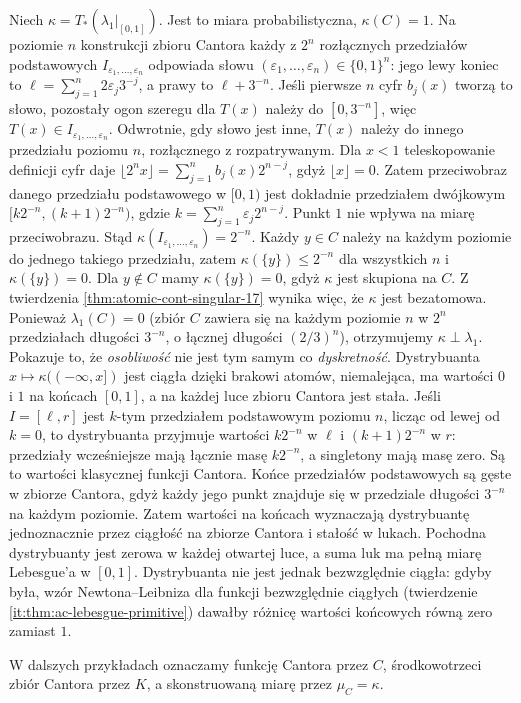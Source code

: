 \begin{przyklad}
Niech $\kappa=T_*(\lambda_1|_{[0,1]})$. Jest to miara
probabilistyczna, $\kappa(C)=1$. Na poziomie $n$ konstrukcji zbioru Cantora
każdy z $2^n$ rozłącznych przedziałów podstawowych
$I_{\varepsilon_1,\ldots,\varepsilon_n}$ odpowiada
słowu $(\varepsilon_1,\ldots,\varepsilon_n)\in\{0,1\}^n$:
jego lewy koniec to $\ell=\sum_{j=1}^n2\varepsilon_j3^{-j}$,
a prawy to $\ell+3^{-n}$. Jeśli pierwsze $n$ cyfr
$b_j(x)$ tworzą to słowo, pozostały ogon szeregu dla
$T(x)$ należy do $[0,3^{-n}]$, więc $T(x)\in
I_{\varepsilon_1,\ldots,\varepsilon_n}$. Odwrotnie,
gdy słowo jest inne, $T(x)$ należy do innego przedziału
poziomu $n$, rozłącznego z rozpatrywanym.
Dla $x<1$ teleskopowanie definicji cyfr daje
$\lfloor2^nx\rfloor=\sum_{j=1}^n b_j(x)2^{n-j}$,
gdyż $\lfloor x\rfloor=0$.
Zatem przeciwobraz danego przedziału podstawowego
w $[0,1)$ jest dokładnie przedziałem dwójkowym
$[k2^{-n},(k+1)2^{-n})$, gdzie
$k=\sum_{j=1}^n\varepsilon_j2^{n-j}$.
Punkt $1$ nie wpływa na miarę przeciwobrazu. Stąd
$\kappa(I_{\varepsilon_1,\ldots,\varepsilon_n})=2^{-n}$.
Każdy $y\in C$ należy na każdym poziomie do jednego
takiego przedziału, zatem
$\kappa(\{y\})\le2^{-n}$ dla wszystkich $n$ i
$\kappa(\{y\})=0$. Dla $y\notin C$ mamy
$\kappa(\{y\})=0$, gdyż $\kappa$ jest skupiona na $C$.
Z twierdzenia \ref{thm:atomic-cont-singular-17} wynika więc, że $\kappa$ jest bezatomowa. Ponieważ
$\lambda_1(C)=0$ (zbiór $C$ zawiera się na każdym poziomie $n$ w $2^n$ przedziałach długości $3^{-n}$, o łącznej długości $(2/3)^n$), otrzymujemy $\kappa\perp\lambda_1$.
Pokazuje to, że \emph{osobliwość} nie jest tym samym co
\emph{dyskretność}. Dystrybuanta $x\mapsto\kappa((-\infty,x])$ jest ciągła dzięki brakowi atomów, niemalejąca, ma wartości $0$ i $1$ na końcach $[0,1]$, a na każdej luce zbioru Cantora jest stała. Jeśli $I=[\ell,r]$ jest $k$-tym przedziałem
podstawowym poziomu $n$, licząc od lewej od $k=0$,
to dystrybuanta przyjmuje wartości $k2^{-n}$ w $\ell$
i $(k+1)2^{-n}$ w $r$: przedziały wcześniejsze mają
łącznie masę $k2^{-n}$, a singletony mają masę zero.
Są to wartości klasycznej funkcji Cantora. Końce
przedziałów podstawowych są gęste w zbiorze Cantora,
gdyż każdy jego punkt znajduje się w przedziale
długości $3^{-n}$ na każdym poziomie. Zatem wartości
na końcach wyznaczają dystrybuantę jednoznacznie
przez ciągłość na zbiorze Cantora i stałość w lukach.
Pochodna dystrybuanty jest zerowa w każdej otwartej
luce, a suma luk ma pełną miarę Lebesgue'a w $[0,1]$.
Dystrybuanta nie jest jednak bezwzględnie ciągła:
gdyby była, wzór Newtona--Leibniza dla funkcji
bezwzględnie ciągłych
(twierdzenie \ref{it:thm:ac-lebesgue-primitive})
dawałby różnicę wartości końcowych równą zero zamiast $1$.
\end{przyklad}
W dalszych przykładach oznaczamy funkcję Cantora przez $C$, środkowotrzeci zbiór Cantora przez $K$, a skonstruowaną miarę przez $\mu_C=\kappa$.

